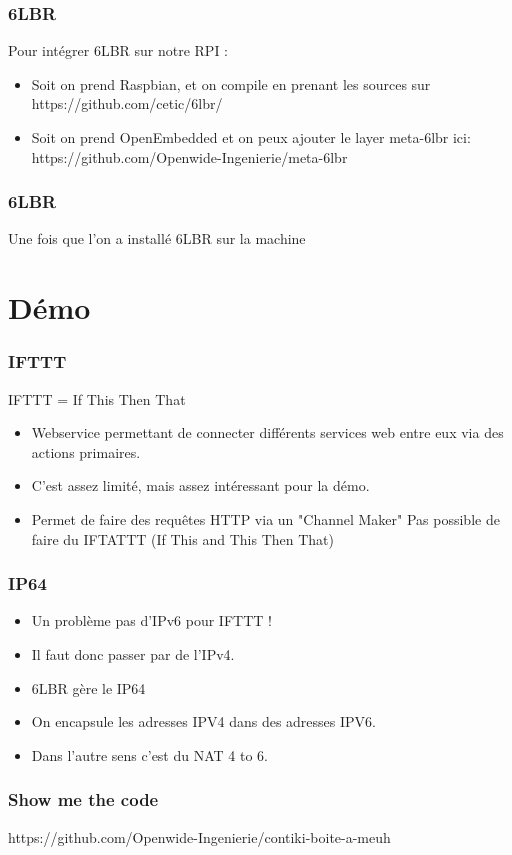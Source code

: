 \documentclass{smilebeamer}
\begin{document}
\begin{frame}
\frametitle{6LBR}

Pour intégrer 6LBR sur notre RPI :
\begin{itemize}
\item Soit on prend Raspbian, et on compile en prenant les sources sur 
https://github.com/cetic/6lbr/
\item Soit on prend OpenEmbedded et on peux ajouter le layer meta-6lbr ici:
https://github.com/Openwide-Ingenierie/meta-6lbr
\end{itemize}
\end{frame}


\begin{frame}
\frametitle{6LBR}

Une fois que l'on a installé 6LBR sur la machine

\end{frame}

\section{Démo}

\begin{frame}
\frametitle{IFTTT}

IFTTT = If This Then That
\begin{itemize}
\item Webservice permettant de connecter différents services web entre eux via des actions primaires.
\item C'est assez limité, mais assez intéressant pour la démo.
\item Permet de faire des requêtes HTTP via un "Channel Maker"
Pas possible de faire du IFTATTT (If This and This Then That)
\end{itemize}
\end{frame}

\begin{frame}
\frametitle{IP64}
\begin{itemize}
\item Un problème pas d'IPv6 pour IFTTT !
\item Il faut donc passer par de l'IPv4.
\item 6LBR gère le IP64
\item On encapsule les adresses IPV4 dans des adresses IPV6.
\item Dans l'autre sens c'est du NAT 4 to 6.
\end{itemize}
\end{frame}

\begin{frame}
\frametitle{Show me the code}
\begin{center}
https://github.com/Openwide-Ingenierie/contiki-boite-a-meuh
\end{center}
\end{frame}
\end{document}
